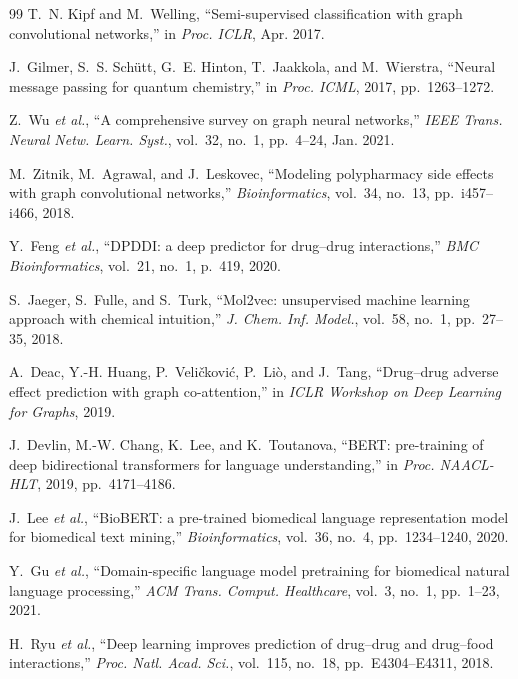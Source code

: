 \documentclass[conference]{IEEEtran}
\begin{document}
\begin{thebibliography}{99}
T.~N. Kipf and M.~Welling,
``Semi-supervised classification with graph convolutional networks,''
in \textit{Proc. ICLR}, Apr. 2017.

J.~Gilmer, S.~S. Schütt, G.~E. Hinton, T.~Jaakkola, and M.~Wierstra,
``Neural message passing for quantum chemistry,''
in \textit{Proc. ICML}, 2017, pp.~1263--1272.

Z.~Wu \textit{et al.},
``A comprehensive survey on graph neural networks,''
\textit{IEEE Trans. Neural Netw. Learn. Syst.}, vol.~32, no.~1, pp.~4--24, Jan. 2021.

M.~Zitnik, M.~Agrawal, and J.~Leskovec,
``Modeling polypharmacy side effects with graph convolutional networks,''
\textit{Bioinformatics}, vol.~34, no.~13, pp.~i457--i466, 2018.

Y.~Feng \textit{et al.},
``DPDDI: a deep predictor for drug--drug interactions,''
\textit{BMC Bioinformatics}, vol.~21, no.~1, p.~419, 2020.

S.~Jaeger, S.~Fulle, and S.~Turk,
``Mol2vec: unsupervised machine learning approach with chemical intuition,''
\textit{J. Chem. Inf. Model.}, vol.~58, no.~1, pp.~27--35, 2018.

A.~Deac, Y.-H. Huang, P.~Veli\v{c}kovi\'c, P.~Li\`o, and J.~Tang,
``Drug--drug adverse effect prediction with graph co-attention,''
in \textit{ICLR Workshop on Deep Learning for Graphs}, 2019.

J.~Devlin, M.-W. Chang, K.~Lee, and K.~Toutanova,
``BERT: pre-training of deep bidirectional transformers for language understanding,''
in \textit{Proc. NAACL-HLT}, 2019, pp.~4171--4186.

J.~Lee \textit{et al.},
``BioBERT: a pre-trained biomedical language representation model for biomedical
text mining,''
\textit{Bioinformatics}, vol.~36, no.~4, pp.~1234--1240, 2020.

Y.~Gu \textit{et al.},
``Domain-specific language model pretraining for biomedical natural language processing,''
\textit{ACM Trans. Comput. Healthcare}, vol.~3, no.~1, pp.~1--23, 2021.

H.~Ryu \textit{et al.},
``Deep learning improves prediction of drug--drug and drug--food interactions,''
\textit{Proc. Natl. Acad. Sci.}, vol.~115, no.~18, pp.~E4304--E4311, 2018.


\end{thebibliography}
\end{document}
